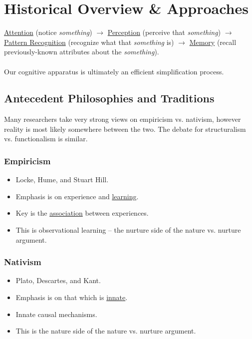 \documentclass[]{article}
\newcommand{\lecture}[1]{\marginpar{{\footnotesize $\leftarrow$ \underline{#1}}}}
\begin{document}
	\section{Historical Overview \& Approaches} \lecture{January 10, 2013}
		\underline{Attention} (notice \emph{something}) $\to$ \underline{Perception} (perceive that \emph{something}) $\to$ \underline{Pattern Recognition} (recognize what that \emph{something} is) $\to$ \underline{Memory} (recall previously-known attributes about the \emph{something}).
		\\ \\
		Our cognitive apparatus is ultimately an efficient simplification process.
		
		\subsection{Antecedent Philosophies and Traditions}
			Many researchers take very strong views on empiricism vs. nativism, however reality is most likely somewhere between the two. The debate for structuralism vs. functionalism is similar.
		
			\subsubsection{Empiricism}
				\begin{itemize}
					\item Locke, Hume, and Stuart Hill.
					\item Emphasis is on experience and \underline{learning}.
					\item Key is the \underline{association} between experiences.
					\item This is observational learning -- the nurture side of the nature vs. nurture argument.
				\end{itemize}
				
			\subsubsection{Nativism}
				\begin{itemize}
					\item Plato, Descartes, and Kant.
					\item Emphasis is on that which is \underline{innate}.
					\item Innate causal mechanisms.
					\item This is the nature side of the nature vs. nurture argument.
				\end{itemize}
				
\end{document}
